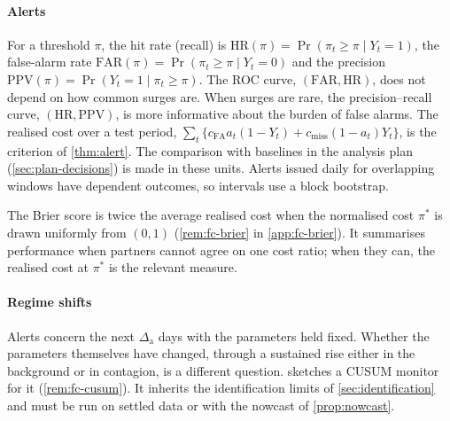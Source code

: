 \paragraph{Alerts} For a threshold $\pi$, the hit rate (recall) is
$\mathrm{HR}(\pi)=\Pr(\pi_t\ge\pi\mid Y_t=1)$, the false-alarm rate
$\mathrm{FAR}(\pi)=\Pr(\pi_t\ge\pi\mid Y_t=0)$ and the precision
$\mathrm{PPV}(\pi)=\Pr(Y_t=1\mid\pi_t\ge\pi)$. The ROC curve, $(\mathrm{FAR},\mathrm{HR})$, does not depend on how common surges are.
When surges are rare, the precision--recall curve, $(\mathrm{HR},\mathrm{PPV})$, is more
informative about the burden of false alarms. The realised cost over a test period,
$\sum_t\{c_{\mathrm{FA}}a_t(1-Y_t)+c_{\mathrm{miss}}(1-a_t)Y_t\}$, is the criterion of
\cref{thm:alert}. The comparison with baselines in the analysis plan
(\cref{sec:plan-decisions}) is made in these units. Alerts issued daily for overlapping
windows have dependent outcomes, so intervals use a block bootstrap.

The Brier score is twice the average realised cost when the normalised cost
$\pi^*$ is drawn uniformly from $(0,1)$ (\cref{rem:fc-brier} in \cref{app:fc-brier}). It
summarises performance when partners cannot agree on one cost ratio; when they can, the
realised cost at $\pi^*$ is the relevant measure.

\paragraph{Regime shifts} Alerts concern the next $\Delta_{\mathrm a}$ days with the
parameters held fixed. Whether the parameters themselves have changed, through a sustained
rise either in the background or in contagion, is a different question.
 sketches a CUSUM monitor for it (\cref{rem:fc-cusum}). It inherits the
identification limits of \cref{sec:identification} and must be run on settled data or with
the nowcast of \cref{prop:nowcast}.
